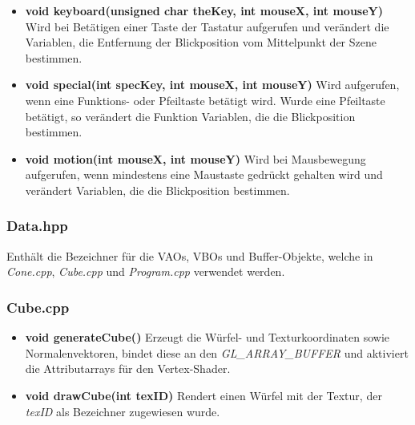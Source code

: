 \documentclass{scrartcl}
\begin{document}
\begin{itemize}
                \item \textbf{void keyboard(unsigned char theKey, int mouseX, int mouseY)}
                    Wird bei Betätigen einer Taste der Tastatur aufgerufen und verändert die 
                    Variablen, die Entfernung der Blickposition vom Mittelpunkt der Szene bestimmen.
                \item \textbf{void special(int specKey, int mouseX, int mouseY)}
                    Wird aufgerufen, wenn eine Funktions- oder Pfeiltaste betätigt wird. Wurde 
                    eine Pfeiltaste betätigt, so verändert die Funktion Variablen, die die 
                    Blickposition bestimmen.
                \item \textbf{void motion(int mouseX, int mouseY)}
                    Wird bei Mausbewegung aufgerufen, wenn mindestens eine Maustaste gedrückt 
                    gehalten wird und verändert Variablen, die die Blickposition bestimmen.
                \end{itemize}

            \subsubsection*{Data.hpp}
                Enthält die Bezeichner für die VAOs, VBOs und Buffer-Objekte, welche in 
                \textit{Cone.cpp}, \textit{Cube.cpp} und \textit{Program.cpp} verwendet 
                werden.
            \subsubsection*{Cube.cpp}
                \begin{itemize}
                    \item \textbf{void generateCube()}
                        Erzeugt die Würfel- und Texturkoordinaten sowie Normalenvektoren, 
                        bindet diese an den \textit{GL\_ARRAY\_BUFFER} und aktiviert die Attributarrays 
                        für den Vertex-Shader.
                    \item \textbf{void drawCube(int texID)}
                        Rendert einen Würfel mit der Textur, der \textit{texID} als Bezeichner zugewiesen wurde.
                \end{itemize}
\end{document}
